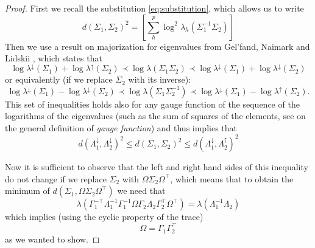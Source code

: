 \documentclass[fleqn]{article}
\theoremstyle{theorem}
\theoremstyle{definition}
\begin{document}
    \begin{proof}
        First we recall the substitution \eqref{eq:substitution}, which allows us to write
        \begin{equation*}
            d(\Sigma_1, \Sigma_2)^2 = \left[\sum_h^p\log^2\lambda_h\left(\Sigma_1^{-1}\Sigma_2\right)\right]
        \end{equation*}
        Then we use a result on majorization for eigenvalues from Gel'fand, Naimark and Lidskii \parencite[theorem \textsc{iii}.4.6 in][73]{Bhatia1997}, which states that
        \begin{equation*}
            \log\lambda^\downarrow(\Sigma_1) + \log\lambda^\uparrow(\Sigma_2) \prec \log\lambda(\Sigma_1\Sigma_2) \prec \log\lambda^\downarrow(\Sigma_1) + \log\lambda^\downarrow(\Sigma_2)
        \end{equation*}
        or equivalently (if we replace $\Sigma_2$ with its inverse):
        \begin{equation*}
            \log\lambda^\downarrow(\Sigma_1) - \log\lambda^\downarrow(\Sigma_2) \prec \log\lambda(\Sigma_1\Sigma_2^{-1}) \prec \log\lambda^\downarrow(\Sigma_1) - \log\lambda^\uparrow(\Sigma_2).
        \end{equation*}
        This set of inequalities holds also for any gauge function of the sequence of the logarithms of the eigenvalues (such as the sum of squares of the elements, see \cite[\S~\textsc{iv}]{Bhatia1997} on the general definition of \emph{gauge function}) and thus implies that
        \begin{equation*}
            d(\Lambda_1^\downarrow, \Lambda_2^\downarrow)^2 \leq d(\Sigma_1, \Sigma_2)^2 \leq d(\Lambda_1^\downarrow, \Lambda_2^\uparrow)^2
        \end{equation*}

        Now it is sufficient to observe that the left and right hand sides of this inequality do not change if we replace $\Sigma_2$ with $\Omega\Sigma_2\Omega^\top$, which means that to obtain the minimum of $d(\Sigma_1, \Omega\Sigma_2\Omega^\top)$ we need that
        \begin{equation*}
            \lambda\left(\Gamma_1^{-\top}\Lambda_1^{-1}\Gamma_1^{-1}\Omega\Gamma_2\Lambda_2\Gamma_2^\top\Omega^\top\right) = \lambda\left(\Lambda_1^{-1}\Lambda_2\right)
        \end{equation*}
        which implies (using the cyclic property of the trace)
        \begin{equation*}
            \Omega =  \Gamma_1\Gamma_2^\top
        \end{equation*}
        as we wanted to show.
    \end{proof}
\end{document}

